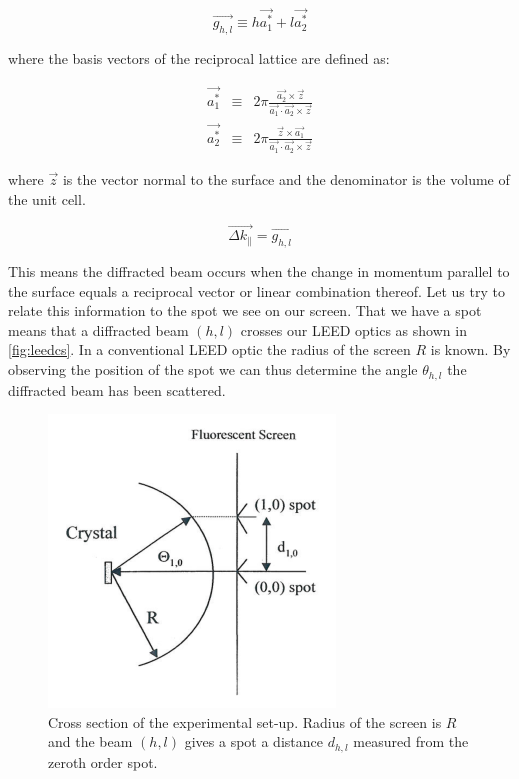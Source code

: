 \begin{equation}
\vec{g_{h,l}}\equiv h\vec{a_1^*}+l\vec{a_2^*}
\end{equation}

\noindent where the basis vectors of the reciprocal lattice are defined as:

\begin{eqnarray}
\vec{a_1^*}	& \equiv	& 2\pi\frac{\vec{a_2}\times\vec{z}}{\vec{a_1}\cdot\vec{a_2}\times\vec{z}}\\
\vec{a_2^*}	& \equiv	& 2\pi\frac{\vec{z}\times\vec{a_1}}{\vec{a_1}\cdot\vec{a_2}\times\vec{z}}
\end{eqnarray}

\noindent where $\vec{z}$ is the vector normal to the surface and the denominator is the volume of the unit cell. 

\begin{equation}
\vec{\Delta k_{\parallel}}=\vec{g_{h,l}}
\end{equation}

This means the diffracted beam occurs when the change in momentum parallel to the surface equals a reciprocal vector or linear combination thereof. Let us try to relate this information to the spot we see on our screen. That we have a spot means that a diffracted beam $(h,l)$ crosses our LEED optics as shown in \autoref{fig:leedcs}. In a conventional LEED optic the radius of the screen $R$ is known. By observing the position of the spot we can thus determine the angle $\theta_{h,l}$ the diffracted beam has been scattered.

\begin{figure}[h!]
	\begin{center}
	\includegraphics[scale=4]{figures/09_09.png}
	\caption{Cross section of the experimental set-up. Radius of the screen is $R$ and the beam $(h,l)$ gives a spot a distance $d_{h,l}$ measured from the zeroth order spot.}
	\label{fig:leedcs}
	\end{center}
\end{figure}

